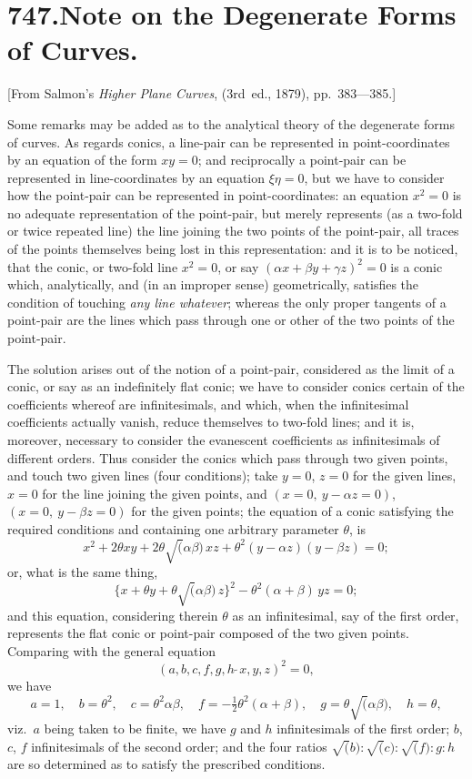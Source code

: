 \documentclass[11pt,a4paper]{book}
\begin{document}
\newpage
\section*{\textbf{747.}\quad Note on the Degenerate Forms of Curves.}

[From Salmon's \textit{Higher Plane Curves}, (3rd~ed., 1879), pp.~383---385.]

\medskip

Some remarks may be added as to the analytical theory of the degenerate forms of curves. As regards conics, a line-pair can be represented in point-coordinates by an equation of the form $xy = 0$; and reciprocally a point-pair can be represented in line-coordinates by an equation $\xi\eta = 0$, but we have to consider how the point-pair can be represented in point-coordinates: an equation $x^2 = 0$ is no adequate representation of the point-pair, but merely represents (as a two-fold or twice repeated line) the line joining the two points of the point-pair, all traces of the points themselves being lost in this representation: and it is to be noticed, that the conic, or two-fold line $x^2 = 0$, or say $(\alpha x + \beta y + \gamma z)^2 = 0$ is a conic which, analytically, and (in an improper sense) geometrically, satisfies the condition of touching \textit{any line whatever}; whereas the only proper tangents of a point-pair are the lines which pass through one or other of the two points of the point-pair.

The solution arises out of the notion of a point-pair, considered as the limit of a conic, or say as an indefinitely flat conic; we have to consider conics certain of the coefficients whereof are infinitesimals, and which, when the infinitesimal coefficients actually vanish, reduce themselves to two-fold lines; and it is, moreover, necessary to consider the evanescent coefficients as infinitesimals of different orders. Thus consider the conics which pass through two given points, and touch two given lines (four conditions); take $y = 0$, $z = 0$ for the given lines, $x = 0$ for the line joining the given points, and $(x = 0,\ y - \alpha z = 0)$, $(x = 0,\ y - \beta z = 0)$ for the given points; the equation of a conic satisfying the required conditions and containing one arbitrary parameter $\theta$, is
\[
x^2 + 2\theta xy + 2\theta\surd(\alpha\beta)\, xz + \theta^2(y - \alpha z)(y - \beta z) = 0;
\]
or, what is the same thing,
\[
\{x + \theta y + \theta\surd(\alpha\beta)\, z\}^2 - \theta^2(\alpha + \beta)\,yz = 0;
\]
and this equation, considering therein $\theta$ as an infinitesimal, say of the first order, represents the flat conic or point-pair composed of the two given points. Comparing with the general equation
\[
(a, b, c, f, g, h\,\!\!\!{\widetilde{\ }}x, y, z)^2 = 0,
\]
we have
\[
a = 1,\quad b = \theta^2,\quad c = \theta^2\alpha\beta,\quad f = -\tfrac{1}{2}\theta^2(\alpha+\beta),\quad g = \theta\surd(\alpha\beta),\quad h = \theta,
\]
viz.~$a$ being taken to be finite, we have $g$ and $h$ infinitesimals of the first order; $b$, $c$, $f$ infinitesimals of the second order; and the four ratios $\surd(b) : \surd(c) : \surd(f) : g : h$ are so determined as to satisfy the prescribed conditions.
\end{document}
